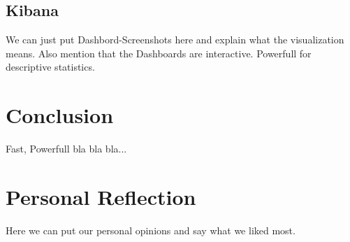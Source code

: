 \documentclass[bibliography=totoc]{article}
\begin{document}
\subsection{Kibana}
We can just put Dashbord-Screenshots here and explain what the visualization means.
Also mention that the Dashboards are interactive. Powerfull for descriptive statistics.

\section{Conclusion}
Fast, Powerfull bla bla bla...

\section{Personal Reflection}
Here we can put our personal opinions and say what we liked most.
\end{document}
